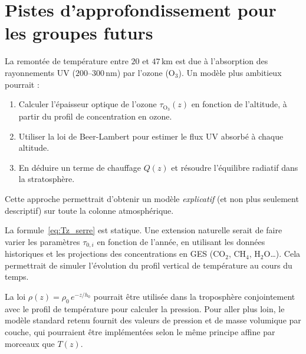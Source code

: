 \documentclass[a4paper,11pt]{article}
\begin{document}
\section{Pistes d'approfondissement pour les groupes futurs}

\begin{piste}[title=Modélisation physique de la stratosphère]
La remontée de température entre $20$ et $47\,\mathrm{km}$ est due à
l'absorption des rayonnements UV ($200$–$300\,\mathrm{nm}$) par l'ozone
($\mathrm{O_3}$). Un modèle plus ambitieux pourrait :
\begin{enumerate}
  \item Calculer l'épaisseur optique de l'ozone $\tau_{\mathrm{O_3}}(z)$ en
        fonction de l'altitude, à partir du profil de concentration en ozone.
  \item Utiliser la loi de Beer-Lambert pour estimer le flux UV absorbé à
        chaque altitude.
  \item En déduire un terme de chauffage $Q(z)$ et résoudre l'équilibre
        radiatif dans la stratosphère.
\end{enumerate}
Cette approche permettrait d'obtenir un modèle \emph{explicatif} (et non plus
seulement descriptif) sur toute la colonne atmosphérique.
\end{piste}

\begin{piste}[title=Couplage avec les GES variables dans le temps]
La formule~\eqref{eq:Tz_serre} est statique. Une extension naturelle serait
de faire varier les paramètres $\tau_{0,i}$ en fonction de l'année, en utilisant
les données historiques et les projections des concentrations en GES
($\mathrm{CO_2}$, $\mathrm{CH_4}$, $\mathrm{H_2O}$\ldots). Cela permettrait
de simuler l'évolution du profil vertical de température au cours du temps.
\end{piste}

\begin{piste}[title=Loi barométrique améliorée]
La loi $\rho(z) = \rho_0\, e^{-z/h_0}$ pourrait être utilisée dans la
troposphère conjointement avec le profil de température pour calculer la
pression. Pour aller plus loin, le modèle standard retenu fournit des valeurs
de pression et de masse volumique par couche, qui pourraient être implémentées
selon le même principe affine par morceaux que $T(z)$.
\end{piste}

\end{document}
